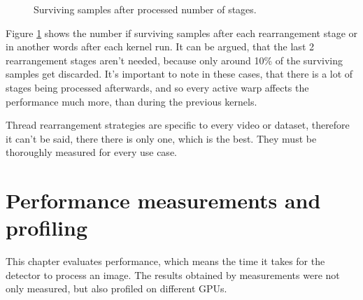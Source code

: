 \begin{figure}[ht]
\centering{}
	\caption{Surviving samples after processed number of stages.}
	\label{fig:survivor-count}
\end{figure}

Figure \ref{fig:survivor-count} shows the number if surviving samples after each rearrangement stage or in another words after each kernel run. It can be argued, that the last 2 rearrangement stages aren't needed, because only around 10\% of the surviving samples get discarded. It's important to note in these cases, that there is a lot of stages being processed afterwards, and so every active warp affects the performance much more, than during the previous kernels.

Thread rearrangement strategies are specific to every video or dataset, therefore it can't be said, there there is only one, which is the best. They must be thoroughly measured for every use case.

\chapter{Performance measurements and profiling}

This chapter evaluates performance, which means the time it takes for the detector to process an image. The results obtained by measurements were not only measured, but also profiled on different GPUs.

